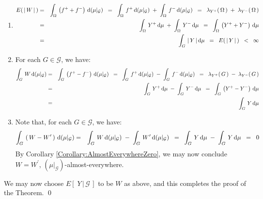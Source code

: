 \begin{enumerate}
\item\begin{eqnarray*}
	E\!\left(\,\vert\,W\,\vert\,\right)
	&=&
		\int_{\Omega}\,\left(f^{+} + f^{-}\right)\,\textnormal{d}(\mu\vert_{\mathcal{G}})
	\;\; = \;\;
		\int_{\Omega}\,f^{+} \,\textnormal{d}(\mu\vert_{\mathcal{G}}) \; + \; \int_{\Omega}\,f^{-}\,\textnormal{d}(\mu\vert_{\mathcal{G}})
	\;\; = \;\;
		\lambda_{Y^{+}}(\,\Omega\,) \; + \; \lambda_{Y^{-}}(\,\Omega\,)
	\\
	& = &
		\int_{\Omega}\,Y^{+} \,\textnormal{d}\mu \; + \; \int_{\Omega}\,Y^{-}\,\textnormal{d}\mu
	\;\; = \;\;
		\int_{\Omega}\,\left(Y^{+} + Y^{-}\right)\,\textnormal{d}\mu
	\\
	& = &
		\int_{G}\,\vert\,Y\,\vert\,\textnormal{d}\mu
	\;\; = \;\;
		E\!\left(\,\vert\,Y\,\vert\,\right)
	\;\; < \;\;
		\infty
	\end{eqnarray*}
\item
	For each $G \in \mathcal{G}$, we have:
	\begin{eqnarray*}
	\int_{G}\,W\,\textnormal{d}(\mu\vert_{\mathcal{G}})
	& = &
		\int_{G}\,\left(f^{+} - f^{-}\right)\,\textnormal{d}(\mu\vert_{\mathcal{G}})
	\;\; = \;\;
		\int_{G}\,f^{+} \,\textnormal{d}(\mu\vert_{\mathcal{G}}) \; - \; \int_{G}\,f^{-}\,\textnormal{d}(\mu\vert_{\mathcal{G}})
	\;\; = \;\;
		\lambda_{Y^{+}}(\,G\,) \; - \; \lambda_{Y^{-}}(\,G\,)
	\\
	& = &
		\int_{G}\,Y^{+} \,\textnormal{d}\mu \; - \; \int_{G}\,Y^{-}\,\textnormal{d}\mu
	\;\; = \;\;
		\int_{G}\,\left(Y^{+} - Y^{-}\right)\,\textnormal{d}\mu
	\\
	& = &
		\int_{G}\,Y\,\textnormal{d}\mu
	\end{eqnarray*}
\item
	Note that, for each $G \in \mathcal{G}$, we have:
	\begin{eqnarray*}
	\int_{G}\,\left(\,W - W^{\prime}\,\right)\,\textnormal{d}(\mu\vert_{\mathcal{G}})
	&=&
		\int_{G}\,W\,\textnormal{d}(\mu\vert_{\mathcal{G}}) \; - \; \int_{G}\,W^{\prime}\,\textnormal{d}(\mu\vert_{\mathcal{G}})
	\;\; = \;\;
		\int_{G}\,Y\,\textnormal{d}\mu \; - \; \int_{G}\,Y\,\textnormal{d}\mu
	\;\; = \;\;
		0
	\end{eqnarray*}
	By Corollary \ref{Corollary:AlmostEverywhereZero}, we may now conclude
	$W = W^{\prime}$, $(\mu\vert_{\mathcal{G}})$-almost-everywhere.
\end{enumerate}
We may now choose $E\!\left[\;Y\,\vert\,\mathcal{G}\,\right]$ to be $W$ as above, and
this completes the proof of the Theorem.
\qed


